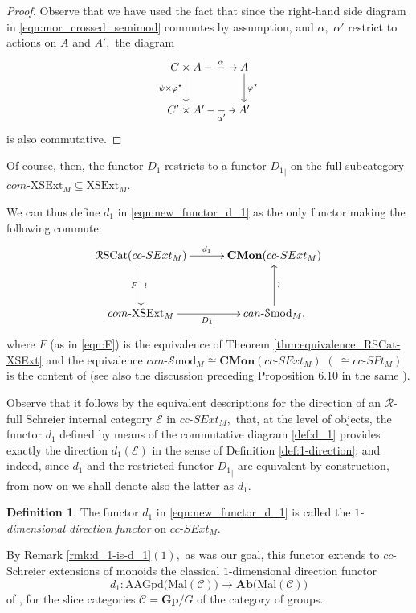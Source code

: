 \documentclass[a4paper]{amsart}
\theoremstyle{plain}
\theoremstyle{definition}
\newtheorem{definition}[subsection]{Definition}
\theoremstyle{remark}
\begin{document}
\begin{proof}
Observe that we have used the fact that since the right-hand side diagram in \eqref{eqn:mor_crossed_semimod} commutes by assumption, and $\alpha,$ $\alpha'$ restrict to actions on $A$ and $A',$ the diagram
\begin{equation*}
\xymatrix{
{C\times A} \ar[d]_-{\psi\times\varphi^\star} \ar@{-->}[r]^-{\alpha} &A \ar[d]^-{\varphi^\star} \\
{C'\times A'} \ar@{-->}[r]_-{\alpha'} &{A'}
}
\end{equation*}
is also commutative.
\end{proof}
Of course, then, the functor $D_1$ restricts to a functor ${D_1}_{\vert}$ on the full subcategory $com\text{-}\mathrm{XSExt}_M\subseteq \mathrm{XSExt}_M.$

We can thus define $d_1$ in \eqref{eqn:new_functor_d_1} as the only functor making the following commute:
\begin{equation}
\label{def:d_1}
\begin{aligned}
\xymatrixcolsep{2.5pc}
\xymatrixrowsep{3pc}
\xymatrix{
{\mathcal{R}\mathrm{SCat}(cc\text{-}SExt_M)} \ar[d]^-{\wr}_-{F} \ar[r]^-{d_1} &{\mathbf{CMon}(cc\text{-}SExt_M)} \\
{com\text{-}\mathrm{XSExt}_M} \ar[r]_-{{D_1}_{\vert}} &{can\text{-}\mathcal{S}\mathrm{mod}_M,} \ar[u]_-{\wr}
}
\end{aligned}
\end{equation}
where $F$ (as in \eqref{eqn:F}) is the equivalence of Theorem \ref{thm:equivalence_RSCat-XSExt} and the equivalence $can\text{-}\mathcal{S}\mathrm{mod}_M\cong\mathbf{CMon}(cc\text{-}SExt_M)$ $(~\cong cc\text{-}SPt_M)$ is the content of \cite[Theorem 6.5]{AMR} (see also the discussion preceding Proposition 6.10 in the same \cite{AMR}).

Observe that it follows by the equivalent descriptions for the direction of an $\mathcal{R}$-full Schreier internal category $\mathcal{E}$ in $cc\text{-}SExt_M,$ that, at the level of objects, the functor $d_1$ defined by means of the commutative diagram \eqref{def:d_1} provides exactly the direction $d_1(\mathcal{E})$ in the sense of Definition \ref{def:1-direction}; and indeed, since $d_1$ and the restricted functor ${D_1}_{\vert}$ are equivalent by construction, from now on we shall denote also the latter as $d_1.$
\begin{definition}
The functor $d_1$ in \eqref{eqn:new_functor_d_1} is called the $1$\emph{-dimensional direction functor} on $cc\text{-}SExt_M.$
\end{definition}
By Remark \ref{rmk:d_1-is-d_1}$(1),$ as was our goal, this functor extends to $cc$-Schreier extensions of monoids the classical $1$-dimensional direction functor
\begin{equation*}
d_1\colon\mathrm{AAGpd}\big(\mathrm{Mal}(\mathcal{C})\big)\longrightarrow\mathbf{Ab}\big(\mathrm{Mal}(\mathcal{C})\big)
\end{equation*}
of \cite{aspherical, Bourn-Rodelo}, for the slice categories $\mathcal{C}=\mathbf{Gp}/G$ of the category of groups.
\end{document}
